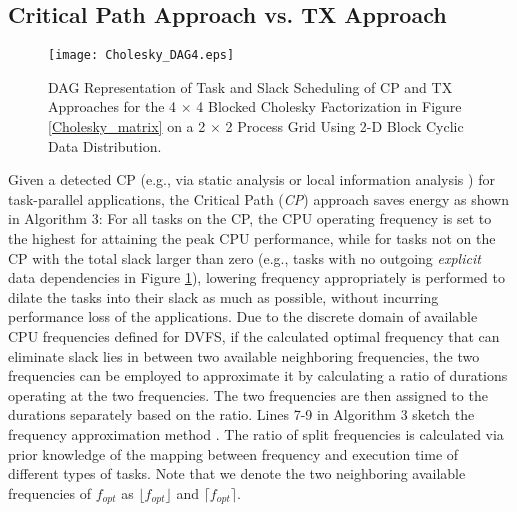 \documentclass[12pt]{elsarticle}
\begin{document}
\subsection{Critical Path Approach vs. TX Approach}

\begin{figure}\centering
\texttt{[image: Cholesky\_DAG4.eps]}\\\caption{DAG Representation of Task and Slack Scheduling of CP and TX Approaches for the 4 $\times$ 4 Blocked Cholesky Factorization in Figure \ref{Cholesky_matrix} on a 2 $\times$ 2 Process Grid Using 2-D Block Cyclic Data Distribution.}
\label{Cholesky_DAG}
\end{figure}

Given a detected CP (e.g., via static analysis \cite{ipdps05a} or local information analysis \cite{ics09}) for task-parallel applications, the Critical Path (\emph{CP}) approach saves energy as shown in Algorithm 3: For all tasks on the CP, the CPU operating frequency is set to the highest for attaining the peak CPU performance, while for tasks not on the CP with the total slack larger than zero (e.g., tasks with no outgoing \emph{explicit} data dependencies in Figure \ref{Cholesky_DAG}), lowering frequency appropriately is performed to dilate the tasks into their slack as much as possible, without incurring performance loss of the applications. Due to the discrete domain of available CPU frequencies defined for DVFS, if the calculated optimal frequency that can eliminate slack lies in between two available neighboring frequencies, the two frequencies can be employed to approximate it by calculating a ratio of durations operating at the two frequencies. The two frequencies are then assigned to the durations separately based on the ratio. Lines 7-9 in Algorithm 3 sketch the frequency approximation method \cite{tpds04} \cite{ics09}. The ratio of split frequencies is calculated via prior knowledge of the mapping between frequency and execution time of different types of tasks. Note that we denote the two neighboring available frequencies of $f_{opt}$ as $\lfloor{f_{opt}}\rfloor$ and $\lceil{f_{opt}}\rceil$.
\end{document}
